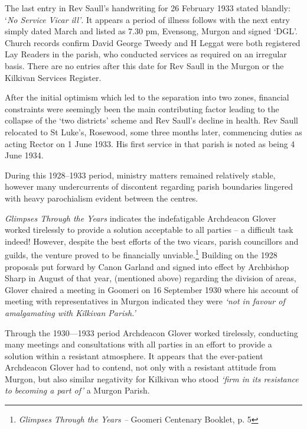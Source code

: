 The last entry in Rev Saull's handwriting for 26 February 1933 stated blandly: `\emph{No Service Vicar ill'}. It appears a period of illness follows with the next entry simply dated March and listed as 7.30 pm, Evensong, Murgon and signed `DGL'. Church records confirm David George Tweedy and H Leggat were both registered Lay Readers in the parish, who conducted services as required on an irregular basis. There are no entries after this date for Rev Saull in the Murgon or the Kilkivan Services Register.



After the initial optimism which led to the separation into two zones, financial constraints were seemingly been the main contributing factor leading to the collapse of the `two districts' scheme and Rev Saull's decline in health. Rev Saull relocated to St Luke's, Rosewood, some three months later, commencing duties as acting Rector on 1 June 1933. His first service in that parish is noted as being 4 June 1934.



During this 1928--1933 period, ministry matters remained relatively stable, however many undercurrents of discontent regarding parish boundaries lingered with heavy parochialism evident between the centres.



\emph{Glimpses Through the Years} indicates the indefatigable Archdeacon Glover worked tirelessly to provide a solution acceptable to all parties -- a difficult task indeed! However, despite the best efforts of the two vicars, parish councillors and guilds, the venture proved to be financially unviable.\footnote{\emph{Glimpses Through the Years --} Goomeri Centenary Booklet, p. 5} Building on the 1928 proposals put forward by Canon Garland and signed into effect by Archbishop Sharp in August of that year, (mentioned above) regarding the division of areas, Glover chaired a meeting in Goomeri on 16 September 1930 where his account of meeting with representatives in Murgon indicated they were \emph{`not in favour of amalgamating with Kilkivan Parish.'}


Through the 1930---1933 period Archdeacon Glover worked tirelessly, conducting many meetings and consultations with all parties in an effort to provide a solution within a resistant atmosphere. It appears that the ever-patient Archdeacon Glover had to contend, not only with a resistant attitude from Murgon, but also similar negativity for Kilkivan who stood \emph{`firm in its resistance to becoming a part of'} a Murgon Parish.



